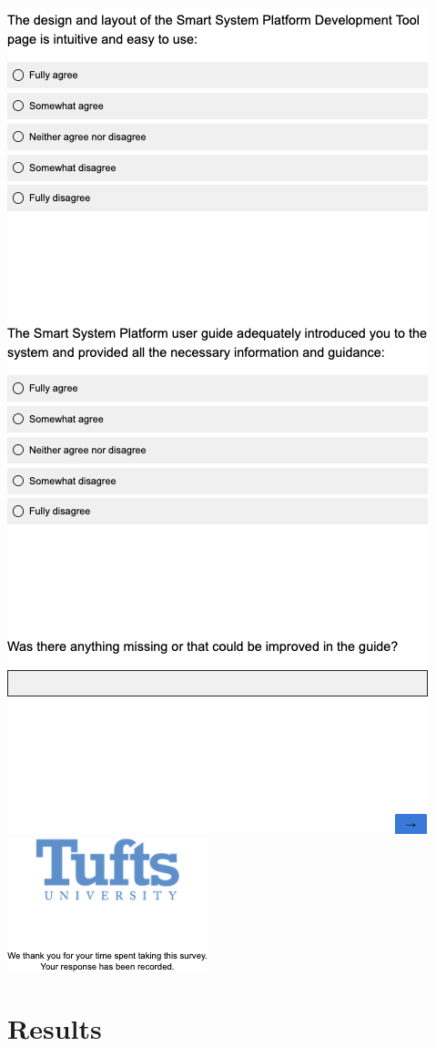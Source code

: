 \begin{multicols}{2}
\vfill
\includegraphics[width=.75\linewidth]{overleaf/images/q10.png}\\
\vfill
\includegraphics[width=.5\linewidth]{overleaf/images/q11.png}
\end{multicols}



\section*{Results}
